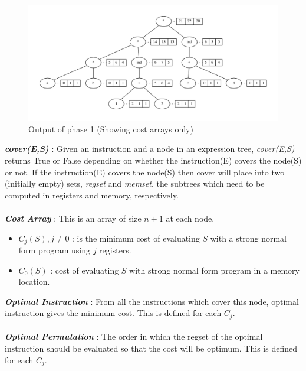 \documentclass{article}
\begin{document}
\begin{figure}[!htb]
\centering
\hspace*{-1.5cm}
\includegraphics[scale=0.5]{phase1.pdf}
\caption{Output of phase 1 (Showing cost arrays only)}
\label{fig:expression}
\end{figure}

\textbf{\emph{cover(E,S)}} : Given an instruction and a node in an expression tree, \emph{cover(E,S)} returns True or False depending on whether the instruction(E) covers the node(S) or not. If the instruction(E) covers the node(S) then cover will place into two (initially empty) sets, \emph{regset} and \emph{memset}, the subtrees which need to be computed in registers and memory, respectively.\\\\

\textbf{\emph{Cost Array}} : This is an array of size $n + 1$ at each node.
\begin{itemize}
\item $C_j(S), j \neq 0$ : is the minimum cost of evaluating $S$ with a strong normal form program using $j$ registers.
\item $C_0(S)$ : cost of evaluating $S$ with strong normal form program in a memory location.\citep{sanyalcode}\\
\end{itemize}

\textbf{\emph{Optimal Instruction}} : From all the instructions which cover this node, optimal instruction gives the minimum cost. This is defined for each $C_j$.\\\\

\textbf{\emph{Optimal Permutation}} : The order in which the regset of the optimal instruction should be evaluated so that the cost will be optimum. This is defined for each $C_j$.\\\\
\end{document}
